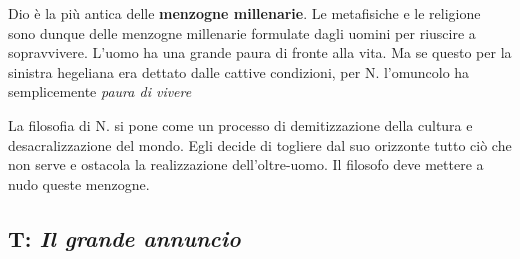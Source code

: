 \documentclass[a4paper, twoside, titlepage]{book}
\begin{document}
Dio è la più antica delle \textbf{menzogne millenarie}. Le metafisiche e le religione sono dunque delle menzogne millenarie formulate dagli uomini per riuscire a sopravvivere.
L'uomo ha una grande paura di fronte alla vita. Ma se questo per la sinistra hegeliana era dettato dalle cattive condizioni, per N. l'omuncolo ha semplicemente \textit{paura di vivere}

La filosofia di N. si pone come un processo di demitizzazione della cultura e desacralizzazione del mondo. Egli decide di togliere dal suo orizzonte tutto ciò che non serve e ostacola la realizzazione dell'oltre-uomo. Il filosofo deve mettere a nudo queste menzogne.

\subsection{T: \textit{Il grande annuncio}}
\end{document}
